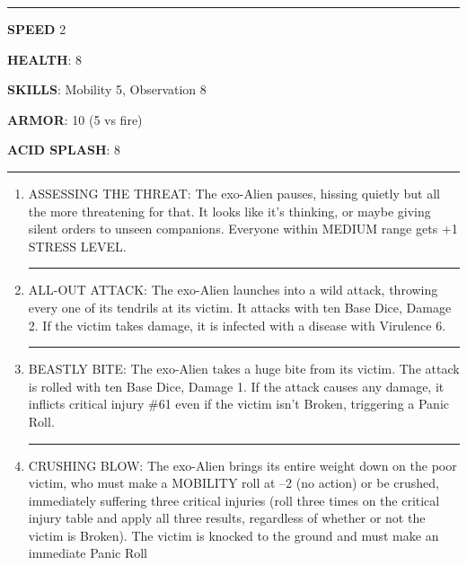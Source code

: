 \begin{rpg-commentbox}{}


    \par\noindent\rule{\textwidth}{0.4pt}

    \textbf{SPEED} 2

    \textbf{HEALTH}: 8

    \textbf{SKILLS}: Mobility 5, Observation 8
    
    \textbf{ARMOR}: 10 (5 vs fire)
    
    \textbf{ACID SPLASH}: 8

    \par\noindent\rule{\textwidth}{0.4pt}

    \begin{small}
    \begin{enumerate}
        \item ASSESSING THE THREAT: The exo-Alien pauses, hissing quietly but all the more threatening
        for that. It looks like it’s thinking, 
        or maybe giving silent orders to unseen companions. Everyone within MEDIUM range gets +1 STRESS LEVEL.

        \par\noindent\rule{.9\textwidth}{0.4pt}
        
        \item  ALL-OUT ATTACK: The exo-Alien launches into a wild attack, throwing every one of its tendrils at its victim. It attacks with ten Base Dice, Damage 2. If the victim takes damage, it is infected with a disease with Virulence 6.

        \par\noindent\rule{.9\textwidth}{0.4pt}

        \item BEASTLY BITE: The exo-Alien takes a huge bite from its victim. The attack is rolled with ten
        Base Dice, Damage 1. If the attack causes any damage, it inflicts critical injury \#61 even if
        the victim isn’t Broken, triggering a Panic Roll.
        
        \par\noindent\rule{.9\textwidth}{0.4pt}

        \item CRUSHING BLOW: The exo-Alien brings its entire weight down on the poor victim, who must
        make a MOBILITY roll at –2 (no action) or be crushed, immediately suffering three critical
        injuries (roll three times on the critical injury table and apply all three results, regardless of
        whether or not the victim is Broken). The victim is knocked to the ground and must make
        an immediate Panic Roll


\end{enumerate}
\end{small}
\end{rpg-commentbox}
